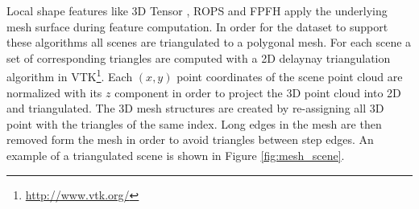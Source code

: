 \documentclass[10pt,twocolumn,letterpaper]{article}
\begin{document}
Local shape features like 3D Tensor \cite{Mian2006}, ROPS \cite{Guo2013} and FPFH \cite{Fpfh2009} apply the underlying mesh surface during feature computation. In order for the dataset to support these algorithms all scenes are triangulated to a polygonal mesh. For each scene a set of corresponding triangles are computed with a 2D delaynay triangulation algorithm in VTK\footnote{\url{http://www.vtk.org/}}. Each $(x,y)$ point coordinates of the scene point cloud are normalized with its $z$ component in order to project the 3D point cloud into 2D and triangulated. The 3D mesh structures are created by re-assigning all 3D point with the triangles of the same index. Long edges in the mesh are then removed form the mesh in order to avoid triangles between step edges. An example of a triangulated scene is shown in Figure \ref{fig:mesh_scene}.
\end{document}
